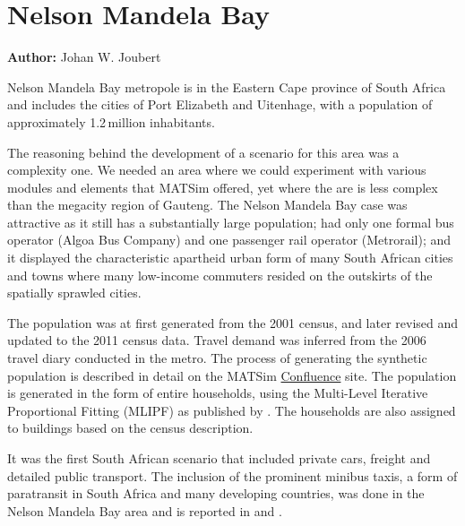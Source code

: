 \section{Nelson Mandela Bay}
\label{sec:nelsonMandelaBay}
\hfill \textbf{Author:} Johan W. Joubert

Nelson Mandela Bay metropole is in the Eastern Cape province of South Africa and includes the cities of Port Elizabeth and Uitenhage, with a population of approximately 1.2\,million inhabitants.

The reasoning behind the development of a scenario for this area was a complexity one. We needed an area where we could experiment with various modules and elements that MATSim offered, yet where the are is less complex than the megacity region of Gauteng. The Nelson Mandela Bay case was attractive as it still has a substantially large population; had only one formal bus operator (Algoa Bus Company) and one passenger rail operator (Metrorail); and it displayed the characteristic apartheid urban form of many South African cities and towns where many low-income commuters resided on the outskirts of the spatially sprawled cities.

The population was at first generated from the 2001 census, and later revised and updated to the 2011 census data. Travel demand was inferred from the 2006 travel diary conducted in the metro. The process of generating the synthetic population is described in detail on the MATSim \href{https://matsim.atlassian.net/wiki/display/MATPUB/South+Africa}{Confluence} site. The population is generated in the form of entire households, using the Multi-Level Iterative Proportional Fitting (MLIPF) as published by \citet[][]{MuellerKAxhausen_LATSIS_2012}. The households are also assigned to buildings based on the census description.

It was the first South African scenario that included private cars, freight and detailed public transport. The inclusion of the prominent minibus taxis, a form of paratransit in South Africa and many developing countries, was done in the Nelson Mandela Bay area and is reported in \citet[][]{Roeder2013MasterMinibus} and \citet[][]{NeumannEtAl2014MinibusRSA}.

